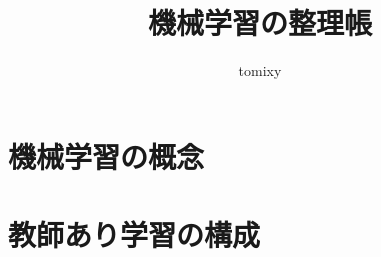 \documentclass[b5paper,12pt,notitlepage]{jsreport}
\title{機械学習の整理帳}
\author{tomixy}
\begin{document}
\maketitle
\tableofcontents

\part{機械学習の概念}



\part{教師あり学習の構成}




\newpage
\end{document}
